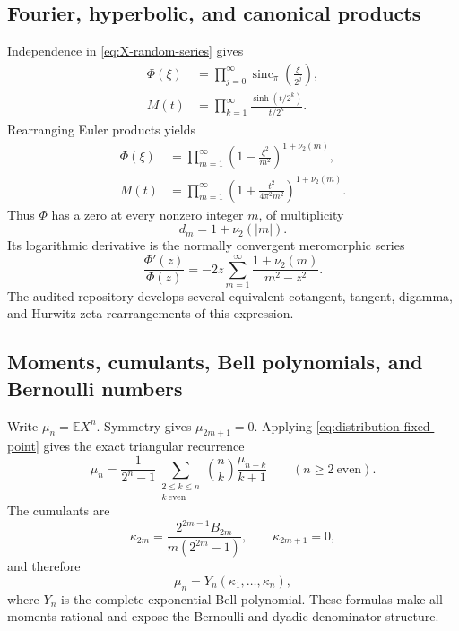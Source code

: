\documentclass[11pt,oneside]{article}
\theoremstyle{definition}
\newcommand{\sincpi}{\operatorname{sinc}_{\!\pi}}
\newcommand{\E}{\mathbb E}
\newcommand{\vTwo}{\nu_2}
\begin{document}
\subsection{Fourier, hyperbolic, and canonical products}

Independence in \eqref{eq:X-random-series} gives
\begin{align}
 \Phi(\xi)
 &=\prod_{j=0}^{\infty}\sincpi\!\left(\frac{\xi}{2^j}\right),
 \label{eq:phi-sinc-product}\\
 M(t)
 &=\prod_{k=1}^{\infty}\frac{\sinh(t/2^k)}{t/2^k}.
 \label{eq:M-hyperbolic-product}
\end{align}
Rearranging Euler products yields
\begin{align}
 \Phi(\xi)
 &=\prod_{m=1}^{\infty}
 \left(1-\frac{\xi^2}{m^2}\right)^{1+\vTwo(m)},
 \label{eq:phi-canonical-product}\\
 M(t)
 &=\prod_{m=1}^{\infty}
 \left(1+\frac{t^2}{4\pi^2m^2}\right)^{1+\vTwo(m)}.
 \label{eq:M-canonical-product}
\end{align}
Thus \(\Phi\) has a zero at every nonzero integer \(m\), of multiplicity
\begin{equation}
 d_m=1+\vTwo(|m|).
 \label{eq:zero-multiplicity}
\end{equation}
Its logarithmic derivative is the normally convergent meromorphic series
\begin{equation}
 \frac{\Phi'(z)}{\Phi(z)}
 =-2z\sum_{m=1}^{\infty}\frac{1+\vTwo(m)}{m^2-z^2}.
 \label{eq:phi-log-derivative}
\end{equation}
The audited repository develops several equivalent cotangent, tangent, digamma, and
Hurwitz-zeta rearrangements of this expression.

\subsection{Moments, cumulants, Bell polynomials, and Bernoulli numbers}

Write \(\mu_n=\E X^n\). Symmetry gives \(\mu_{2m+1}=0\). Applying
\eqref{eq:distribution-fixed-point} gives the exact triangular recurrence
\begin{equation}
 \mu_n=\frac{1}{2^n-1}
 \sum_{\substack{2\le k\le n\\k\ \mathrm{even}}}
 \binom{n}{k}\frac{\mu_{n-k}}{k+1}
 \qquad(n\ge2\ \mathrm{even}).
 \label{eq:moment-recurrence}
\end{equation}
The cumulants are
\begin{equation}
 \kappa_{2m}=\frac{2^{2m-1}B_{2m}}{m(2^{2m}-1)},
 \qquad \kappa_{2m+1}=0,
 \label{eq:cumulants}
\end{equation}
and therefore
\begin{equation}
 \mu_n=Y_n(\kappa_1,\ldots,\kappa_n),
 \label{eq:Bell-moments}
\end{equation}
where \(Y_n\) is the complete exponential Bell polynomial. These formulas make all moments
rational and expose the Bernoulli and dyadic denominator structure.
\end{document}
